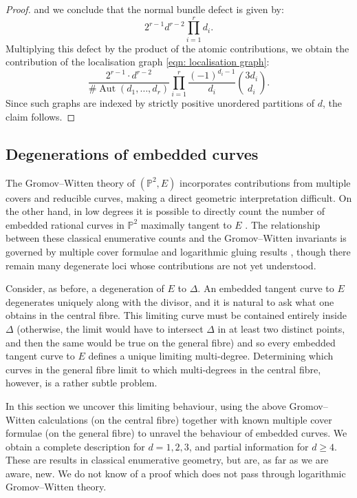 \documentclass[11pt]{amsart}
\theoremstyle{definition}
\theoremstyle{definition}
\newcommand{\PP}{\mathbb{P}}
\begin{document}
\begin{proof}
and we conclude that the normal bundle defect is given by:
\begin{equation*} 2^{r-1} d^{r-2} \prod_{i=1}^r d_i. \end{equation*}
Multiplying this defect by the product of the atomic contributions, we obtain the contribution of the localisation graph \eqref{eqn: localisation graph}:
\begin{equation*} \dfrac{2^{r-1} \cdot d^{r-2}}{\#\!\operatorname{Aut}(d_1,\ldots,d_r)} \prod_{i=1}^r \dfrac{(-1)^{d_i-1}}{d_i} {3d_i \choose d_i}.\end{equation*}
Since such graphs are indexed by strictly positive unordered partitions of $d$, the claim follows.\end{proof}

\subsection{Degenerations of embedded curves}\label{sec: degenerations of curves}\label{sec: embedded curves} The Gromov--Witten theory of $(\PP^2,E)$ incorporates contributions from multiple covers and reducible curves, making a direct geometric interpretation difficult. On the other hand, in low degrees it is possible to directly count the number of embedded rational curves in $\PP^2$ maximally tangent to $E$ \cite{TakahashiCurvesComplement}. The relationship between these classical enumerative counts and the Gromov--Witten invariants is governed by multiple cover formulae \cite[\S 6]{GPS} and logarithmic gluing results \cite{CvGKTDegenerateContributions}, though there remain many degenerate loci whose contributions are not yet understood.

Consider, as before, a degeneration of $E$ to $\Delta$. An embedded tangent curve to $E$ degenerates uniquely along with the divisor, and it is natural to ask what one obtains in the central fibre. This limiting curve must be contained entirely inside $\Delta$ (otherwise, the limit would have to intersect $\Delta$ in at least two distinct points, and then the same would be true on the general fibre) and so every embedded tangent curve to $E$ defines a unique limiting multi-degree. Determining which curves in the general fibre limit to which multi-degrees in the central fibre, however, is a rather subtle problem.

In this section we uncover this limiting behaviour, using the above Gromov--Witten calculations (on the central fibre) together with known multiple cover formulae (on the general fibre) to unravel the behaviour of embedded curves. We obtain a complete description for $d=1,2,3$, and partial information for $d \geq 4$. These are results in classical enumerative geometry, but are, as far as we are aware, new. We do not know of a proof which does not pass through logarithmic Gromov--Witten theory.
\end{document}
